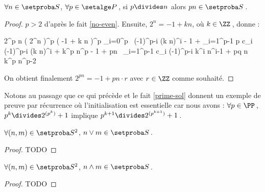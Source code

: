 \begin{fact}
	$\forall n \in \ourset$, $\forall p \in \primeset$\,,
	si $p \divides n$ alors $p n \in \ourset$\,.
\end{fact}

\begin{proof}
	$p > 2$ d'après le fait \ref{no-even}.
	Ensuite, $2^n = -1 + k n$, où $k \in \ZZ$\,, donne :

    \medskip
    
    \begin{stepcalc}[style=sar]
    	2^{p n}
    \explnext{}
    	\big( 2^n \big)^p
    \explnext{}
    	\big( -1 + k n \big)^p
    \explnext{}
    	\dsum_{i=0}^p  \, (-1)^{p-i} \cdot (k n)^i
    	- 1 + \dsum_{i=1}^{p-1} p c_i \cdot (-1)^{p-i} \cdot (k n)^i + k^p \cdot n^p
    	- 1 + pn \, \dsum_{i=1}^{p-1} c_i \cdot (-1)^{p-i} \cdot k^i n^{i-1} + pq \cdot n \cdot k^p \cdot n^{p-2}
    \end{stepcalc}

    \medskip

    On obtient finalement $2^{p n} = - 1 + pn \cdot r$ avec $r \in \ZZ$ comme souhaité.
\end{proof}




Notons au passage que ce qui précède et le fait \ref{prime-sol} donnent un exemple de preuve par récurrence où l'initialisation est essentielle car nous avons :
$\forall p \in \PP$\,, $p^k \divides 2^{( p^k )} + 1$ 
implique
$p^{k+1} \divides 2^{( p^{k+1} )} + 1$\,.




\begin{fact}
	$\forall (n , m) \in \ourset^2$, $n \vee m \in \ourset$\,.
\end{fact}

\begin{proof}
	TODO
\end{proof}




\begin{fact}
	$\forall (n , m) \in \ourset^2$, $n \wedge m \in \ourset$\,.
\end{fact}

\begin{proof}
	TODO
\end{proof}




